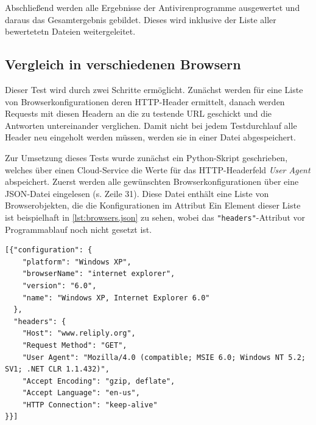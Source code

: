 Abschließend werden alle Ergebnisse der Antivirenprogramme ausgewertet und daraus das Gesamtergebnis gebildet. Dieses wird inklusive der Liste aller bewertetetn Dateien weitergeleitet.

\subsection{Vergleich in verschiedenen Browsern}

Dieser Test wird durch zwei Schritte ermöglicht.
Zunächst werden für eine Liste von Browserkonfigurationen deren \ac{HTTP}-Header ermittelt, danach werden Requests mit diesen Headern an die zu testende \ac{URL} geschickt und die Antworten untereinander verglichen.
Damit nicht bei jedem Testdurchlauf alle Header neu eingeholt werden müssen, werden sie in einer Datei abgespeichert.

Zur Umsetzung dieses Tests wurde zunächst ein Python-Skript geschrieben, welches über einen Cloud-Service die Werte für das \ac{HTTP}-Headerfeld \textit{User Agent} abspeichert.
Zuerst werden alle gewünschten Browserkonfigurationen über eine \ac{JSON}-Datei eingelesen (s. Zeile 31).
Diese Datei enthält eine Liste von Browserobjekten, die die Konfigurationen im Attribut 
Ein Element dieser Liste ist beispielhaft in \autoref{lst:browsers.json} zu sehen, wobei das \lstinline{"headers"}-Attribut vor Programmablauf noch nicht gesetzt ist.

\begin{scriptsize}
\begin{lstlisting}
[{"configuration": {
    "platform": "Windows XP",
    "browserName": "internet explorer",
    "version": "6.0",
    "name": "Windows XP, Internet Explorer 6.0"
  },
  "headers": {
    "Host": "www.reliply.org",
    "Request Method": "GET",
    "User Agent": "Mozilla/4.0 (compatible; MSIE 6.0; Windows NT 5.2; SV1; .NET CLR 1.1.432)",
    "Accept Encoding": "gzip, deflate",
    "Accept Language": "en-us",
    "HTTP Connection": "keep-alive"
}}]
\end{lstlisting}
\end{scriptsize}


